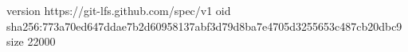 version https://git-lfs.github.com/spec/v1
oid sha256:773a70ed647ddae7b2d60958137abf3d79d8ba7e4705d3255653c487cb20dbc9
size 22000
